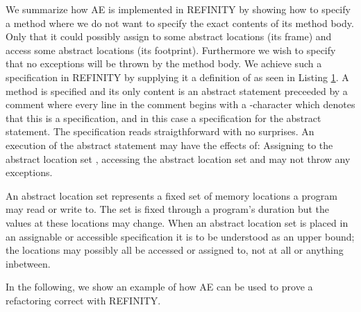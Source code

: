 We summarize how AE is implemented in REFINITY by showing how to specify a method  where we do not want to specify the exact contents of its method body.
Only that it could possibly assign to some abstract locations (its frame) and access some abstract locations (its footprint).
Furthermore we wish to specify that no exceptions will be thrown by the method body.
We achieve such a specification in REFINITY by supplying it a definition of  as seen in Listing \ref{lst:ExtractVariable-refinity-method}.
A method is specified and its only content is an abstract statement  preceeded by a comment where every line in the
comment begins with a -character which denotes that this is a specification, and in this case a specification for the abstract statement.
The specification reads straigthforward with no surprises. An execution of the abstract statement  may have the effects of: Assigning to the
abstract location set , accessing the abstract location set  and may not throw any exceptions.

An abstract location set represents a fixed set of memory locations a program may read or write to.
The set is fixed through a program's duration but the values at these locations may change.
When an abstract location set is placed in an assignable or accessible specification it is to be understood as an upper bound;
the locations may possibly all be accessed or assigned to, not at all or anything inbetween.

\begin{figure}[h]
  \centering
  \begin{minipage}{.65\linewidth}
  
  \label{lst:ExtractVariable-refinity-method}
  \end{minipage}
\end{figure}


In the following, we show an example of how AE can be used to prove a refactoring correct with REFINITY. 

